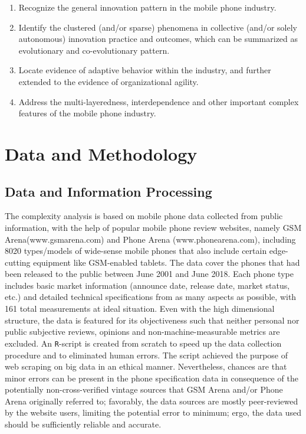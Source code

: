 \documentclass[utf8,english]{gradu3}
\begin{document}
\begin{enumerate}
    \item Recognize the general innovation pattern in the mobile phone industry.
    \item Identify the clustered (and/or sparse) phenomena in collective (and/or solely autonomous) innovation practice and outcomes, which can be summarized as evolutionary and co-evolutionary pattern.
    \item Locate evidence of adaptive behavior within the industry, and further extended to the evidence of organizational agility.
    \item Address the multi-layeredness, interdependence and other important complex features of the mobile phone industry.
\end{enumerate}

\chapter{Data and Methodology}

\section{Data and Information Processing}

The complexity analysis is based on mobile phone data collected from public information, with the help of popular mobile phone review websites, namely GSM Arena(www.gsmarena.com) and Phone Arena (www.phonearena.com), including 8020 types/models of wide-sense mobile phones that also include certain edge-cutting equipment like GSM-enabled tablets. The data cover the phones that had been released to the public between June 2001 and June 2018. Each phone type includes basic market information (announce date, release date, market status, etc.) and detailed technical specifications from as many aspects as possible, with 161 total measurements at ideal situation. Even with the high dimensional structure, the data is featured for its objectiveness such that neither personal nor public subjective reviews, opinions and non-machine-measurable metrics are excluded. An \texttt{R}-script is created from scratch to speed up the data collection procedure and to eliminated human errors. The script achieved the purpose of web scraping on big data in an ethical manner. Nevertheless, chances are that minor errors can be present in the phone specification data in consequence of the potentially non-cross-verified vintage sources that GSM Arena and/or Phone Arena originally referred to; favorably, the data sources are mostly peer-reviewed by the website users, limiting the potential error to minimum; ergo, the data used should be sufficiently reliable and accurate.
\end{document}
